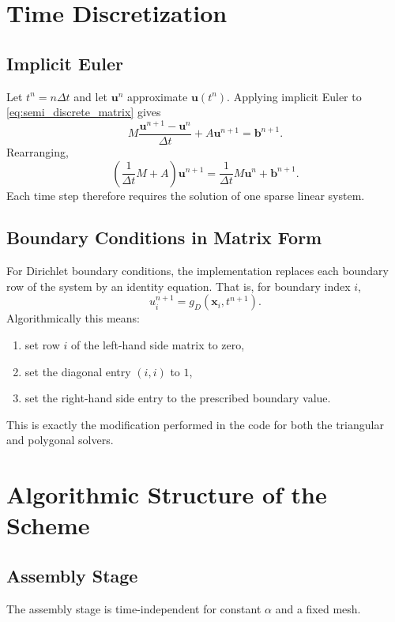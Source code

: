 \documentclass[11pt]{article}
\theoremstyle{plain}
\theoremstyle{definition}
\theoremstyle{remark}
\numberwithin{equation}{section}
\begin{document}
\section{Time Discretization}
\subsection{Implicit Euler}
Let $t^n = n \Delta t$ and let $\bm{u}^n$ approximate $\bm{u}(t^n)$. Applying implicit Euler to \cref{eq:semi_discrete_matrix} gives
\begin{equation}
\label{eq:implicit_euler}
M \frac{\bm{u}^{n+1} - \bm{u}^n}{\Delta t} + A \bm{u}^{n+1} = \bm{b}^{n+1}.
\end{equation}
Rearranging,
\begin{equation}
\label{eq:linear_system}
\left( \frac{1}{\Delta t} M + A \right) \bm{u}^{n+1}
= \frac{1}{\Delta t} M \bm{u}^n + \bm{b}^{n+1}.
\end{equation}
Each time step therefore requires the solution of one sparse linear system.

\subsection{Boundary Conditions in Matrix Form}
For Dirichlet boundary conditions, the implementation replaces each boundary row of the system by an identity equation. That is, for boundary index $i$,
\begin{equation}
\label{eq:dirichlet_row}
u_i^{n+1} = g_D(\bm{x}_i, t^{n+1}).
\end{equation}
Algorithmically this means:
\begin{enumerate}[label=\arabic*.]
\item set row $i$ of the left-hand side matrix to zero,
\item set the diagonal entry $(i,i)$ to $1$,
\item set the right-hand side entry to the prescribed boundary value.
\end{enumerate}

This is exactly the modification performed in the code for both the triangular and polygonal solvers.

\section{Algorithmic Structure of the Scheme}
\subsection{Assembly Stage}
The assembly stage is time-independent for constant $\alpha$ and a fixed mesh.
\end{document}
